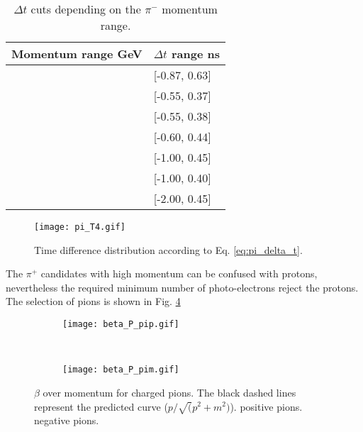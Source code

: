 %
\begin{table}
\centering
\begin{tabular}{|l|l|}
\hline
Momentum range GeV & $\Delta t$ range ns\\ \hline
[0.00, 0.50] & [-0.87, 0.63]\\ \hline
[0.50, 1.00] & [-0.55, 0.37]\\ \hline
[1.00, 1.50] & [-0.55, 0.38]\\ \hline
[1.50, 2.00] & [-0.60, 0.44]\\ \hline
[2.00, 2.50] & [-1.00, 0.45]\\ \hline
[2.50, 3.00] & [-1.00, 0.40]\\ \hline
[3.00, $\infty$] & [-2.00, 0.45]\\ \hline
\end{tabular}
\caption{$\Delta t$ cuts depending on the $\pi^-$ momentum range.}
\label{tb:pim_DeltaCut}
\end{table}

\begin{figure}[!ht]
\centering
\texttt{[image: pi\_T4.gif]}
\caption{Time difference distribution according to Eq. \eqref{eq:pi_delta_t}.}
\label{fig:pi_delta_t}
\end{figure}

The $\pi^+$ candidates with high momentum can be confused with protons, nevertheless the required minimum number of photo-electrons reject the protons. The selection of pions is shown  in Fig. \ref{fig:beta_pi}
\begin{figure}[!ht]
\centering
\begin{subfigure}[b]{0.45\textwidth}
\texttt{[image: beta\_P\_pip.gif]}
\caption{}
\label{fig:beta_pip}
\end{subfigure}
~
\begin{subfigure}[b]{0.45\textwidth}
\texttt{[image: beta\_P\_pim.gif]}
\caption{}
\label{fig:beta_pim}
\end{subfigure}
\caption{$\beta$ over momentum for charged pions. The black dashed lines represent the predicted curve ($p/\sqrt(p^2 + m^2)$). \protect{} positive pions.  \protect{} negative pions.}
\label{fig:beta_pi}
\end{figure}
\clearpage


